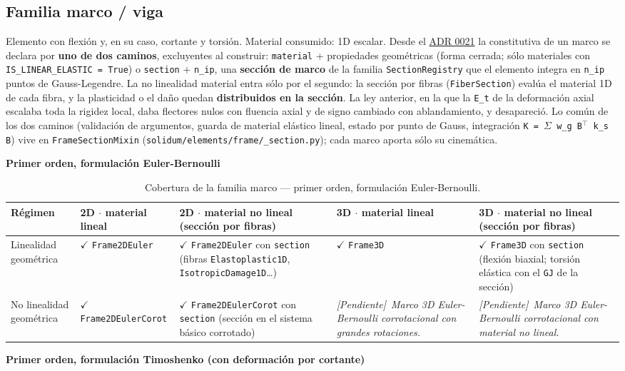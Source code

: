 \documentclass[11pt,oneside]{report}
\newcommand{\pendiente}[1]{\textcolor{pendienteorange}{\textit{[Pendiente]}~\textcolor{pendienteorange}{\textit{#1}}}}
\begin{document}
\subsection{Familia marco / viga}

Elemento con flexión y, en su caso, cortante y torsión. Material consumido: 1D escalar. Desde el \hyperref[adr:0021]{ADR 0021} la constitutiva de un marco se declara por \textbf{uno de dos caminos}, excluyentes al construir: \texttt{material} + propiedades geométricas (forma cerrada; sólo materiales con \texttt{IS\_\allowbreak{}LINEAR\_\allowbreak{}ELASTIC = True}) o \texttt{section} + \texttt{n\_ip}, una \textbf{sección de marco} de la familia \texttt{SectionRegistry} que el elemento integra en \texttt{n\_ip} puntos de Gauss-Legendre. La no linealidad material entra sólo por el segundo: la sección por fibras (\texttt{FiberSection}) evalúa el material 1D de cada fibra, y la plasticidad o el daño quedan \textbf{distribuidos en la sección}. La ley anterior, en la que la \texttt{E\_t} de la deformación axial escalaba toda la rigidez local, daba flectores nulos con fluencia axial y de signo cambiado con ablandamiento, y desapareció. Lo común de los dos caminos (validación de argumentos, guarda de material elástico lineal, estado por punto de Gauss, integración \texttt{K = \ensuremath{\Sigma} w\_\allowbreak{}g B\ensuremath{^{\top}} k\_\allowbreak{}s B}) vive en \texttt{FrameSectionMixin} (\texttt{solidum/\allowbreak{}elements/\allowbreak{}frame/\allowbreak{}\_\allowbreak{}section.\allowbreak{}py}); cada marco aporta sólo su cinemática.

\textbf{Primer orden, formulación Euler-Bernoulli}

\begin{table}[h]
\centering
\caption{Cobertura de la familia marco --- primer orden, formulación Euler-Bernoulli.}
\begin{tabularx}{\textwidth}{YYYYY}
\hline
\textbf{Régimen} & \textbf{2D \ensuremath{\cdot} material lineal} & \textbf{2D \ensuremath{\cdot} material no lineal (sección por fibras)} & \textbf{3D \ensuremath{\cdot} material lineal} & \textbf{3D \ensuremath{\cdot} material no lineal (sección por fibras)} \\
\hline
Linealidad geométrica & \ensuremath{\checkmark} \texttt{Frame2DEuler} & \ensuremath{\checkmark} \texttt{Frame2DEuler} con \texttt{section} (fibras \texttt{Elastoplastic1D}, \texttt{IsotropicDamage1D}\ldots{}) & \ensuremath{\checkmark} \texttt{Frame3D} & \ensuremath{\checkmark} \texttt{Frame3D} con \texttt{section} (flexión biaxial; torsión elástica con el \texttt{GJ} de la sección) \\
No linealidad geométrica & \ensuremath{\checkmark} \texttt{Frame2DEulerCorot} & \ensuremath{\checkmark} \texttt{Frame2DEulerCorot} con \texttt{section} (sección en el sistema básico corrotado) & \pendiente{Marco 3D Euler-Bernoulli corrotacional con grandes rotaciones.} & \pendiente{Marco 3D Euler-Bernoulli corrotacional con material no lineal.} \\
\hline
\end{tabularx}
\end{table}
\textbf{Primer orden, formulación Timoshenko (con deformación por cortante)}
\end{document}
